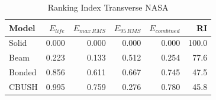 \begin{table}[H]
    \centering
    \caption{Ranking Index Transverse NASA}
    \label{tab:RI_table_VerticalNasa}
    \begin{tabular}{lrrrrr}
        \toprule
        \textbf{Model}  & \textbf{$E_{life}$} & \textbf{$E_{max\, RMS}$} & \textbf{$E_{95\, RMS}$} & \textbf{$E_{combined}$} & \textbf{RI} \\
        \midrule
        Solid  & 0.000 & 0.000 & 0.000 & 0.000 & 100.0 \\
        Beam  & 0.223 & 0.133 & 0.512 & 0.254 & 77.6 \\
        Bonded  & 0.856 & 0.611 & 0.667 & 0.745 & 47.5 \\
        CBUSH  & 0.995 & 0.759 & 0.276 & 0.780 & 45.8 \\
        \bottomrule
    \end{tabular}
\end{table}
